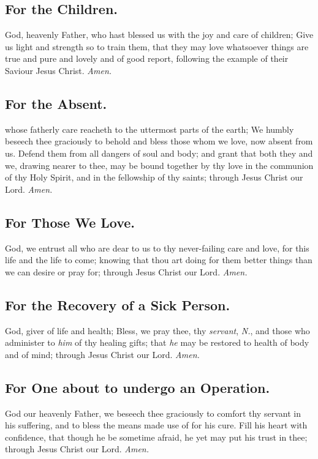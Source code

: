 \subsection{For the Children.}
 God, heavenly Father, who hast blessed us with the joy and care of children; Give us light and strength so to train them, that they may love whatsoever things are true and pure and lovely and of good report, following the example of their Saviour Jesus Christ. \textit{Amen.}

\subsection{For the Absent.}
 whose fatherly care reacheth to the uttermost parts of the earth; We humbly beseech thee graciously to behold and bless those whom we love, now absent from us. Defend them from all dangers of soul and body; and grant that both they and we, drawing nearer to thee, may be bound together by thy love in the communion of thy Holy Spirit, and in the fellowship of thy saints; through Jesus Christ our Lord. \textit{Amen.}

\subsection{For Those We Love.}
 God, we entrust all who are dear to us to thy never-failing care and love, for this life and the life to come; knowing that thou art doing for them better things than we can desire or pray for; through Jesus Christ our Lord. \textit{Amen.}

\subsection{For the Recovery of a Sick Person.}
 God, giver of life and health; Bless, we pray thee, thy \textit{servant}, \textit{N.}, and those who administer to \textit{him} of thy healing gifts; that \textit{he} may be restored to health of body and of mind; through Jesus Christ our Lord. \textit{Amen.}

\subsection{For One about to undergo an Operation.}
 God our heavenly Father, we beseech thee graciously to comfort thy servant in his suffering, and to bless the means made use of for his cure. Fill his heart with confidence, that though he be sometime afraid, he yet may put his trust in thee; through Jesus Christ our Lord. \textit{Amen.}


